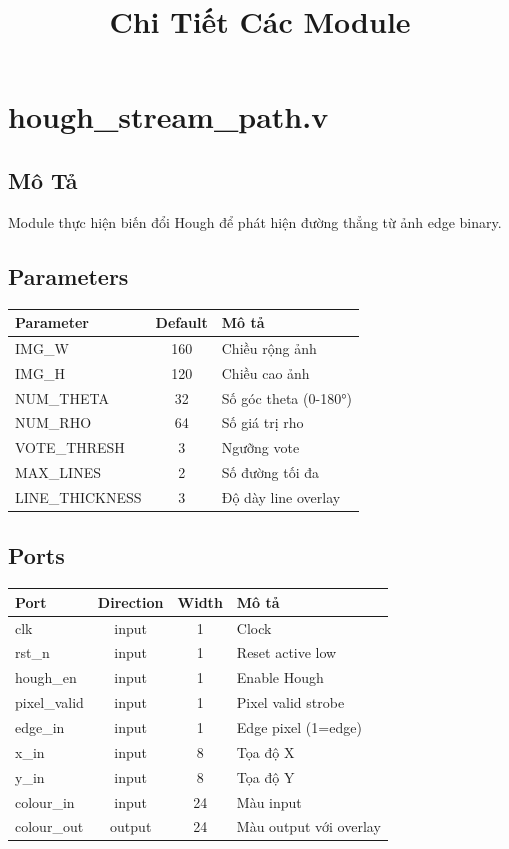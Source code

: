 \documentclass[12pt,a4paper]{article}
\title{Chi Tiết Các Module}
\author{}
\date{}
\begin{document}
\maketitle

\tableofcontents
\newpage

\section{hough\_stream\_path.v}

\subsection{Mô Tả}
Module thực hiện biến đổi Hough để phát hiện đường thẳng từ ảnh edge binary.

\subsection{Parameters}
\begin{table}[h]
\centering
\begin{tabular}{|l|c|l|}
\hline
\textbf{Parameter} & \textbf{Default} & \textbf{Mô tả} \\
\hline
IMG\_W & 160 & Chiều rộng ảnh \\
IMG\_H & 120 & Chiều cao ảnh \\
NUM\_THETA & 32 & Số góc theta (0-180°) \\
NUM\_RHO & 64 & Số giá trị rho \\
VOTE\_THRESH & 3 & Ngưỡng vote \\
MAX\_LINES & 2 & Số đường tối đa \\
LINE\_THICKNESS & 3 & Độ dày line overlay \\
\hline
\end{tabular}
\end{table}

\subsection{Ports}
\begin{table}[h]
\centering
\begin{tabular}{|l|c|c|l|}
\hline
\textbf{Port} & \textbf{Direction} & \textbf{Width} & \textbf{Mô tả} \\
\hline
clk & input & 1 & Clock \\
rst\_n & input & 1 & Reset active low \\
hough\_en & input & 1 & Enable Hough \\
pixel\_valid & input & 1 & Pixel valid strobe \\
edge\_in & input & 1 & Edge pixel (1=edge) \\
x\_in & input & 8 & Tọa độ X \\
y\_in & input & 8 & Tọa độ Y \\
colour\_in & input & 24 & Màu input \\
colour\_out & output & 24 & Màu output với overlay \\
\hline
\end{tabular}
\end{table}
\end{document}
